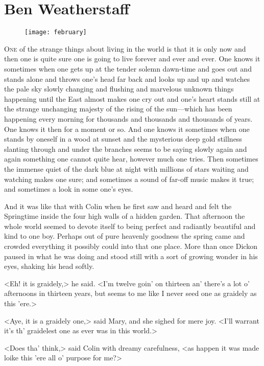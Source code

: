 \chapter{Ben Weatherstaff} 
	
\begin{figure}[t!]
\centering
\texttt{[image: february]}
\end{figure}

	\lettrine[]{O}{ne} of the strange things about living in the world is that it is only now and then one is quite sure one is going to live forever and ever and ever. One knows it sometimes when one gets up at the tender solemn dawn-time and goes out and stands alone and throws one's head far back and looks up and up and watches the pale sky slowly changing and flushing and marvelous unknown things happening until the East almost makes one cry out and one's heart stands still at the strange unchanging majesty of the rising of the sun—which has been happening every morning for thousands and thousands and thousands of years. One knows it then for a moment or so. And one knows it sometimes when one stands by oneself in a wood at sunset and the mysterious deep gold stillness slanting through and under the branches seems to be saying slowly again and again something one cannot quite hear, however much one tries. Then sometimes the immense quiet of the dark blue at night with millions of stars waiting and watching makes one sure; and sometimes a sound of far-off music makes it true; and sometimes a look in some one's eyes.

And it was like that with Colin when he first saw and heard and felt the Springtime inside the four high walls of a hidden garden. That afternoon the whole world seemed to devote itself to being perfect and radiantly beautiful and kind to one boy. Perhaps out of pure heavenly goodness the spring came and crowded everything it possibly could into that one place. More than once Dickon paused in what he was doing and stood still with a sort of growing wonder in his eyes, shaking his head softly.

<Eh! it is graidely,> he said. <I'm twelve goin' on thirteen an' there's a lot o' afternoons in thirteen years, but seems to me like I never seed one as graidely as this 'ere.>

<Aye, it is a graidely one,> said Mary, and she sighed for mere joy. <I'll warrant it's th' graidelest one as ever was in this world.>

<Does tha' think,> said Colin with dreamy carefulness, <as happen it was made loike this 'ere all o' purpose for me?>

